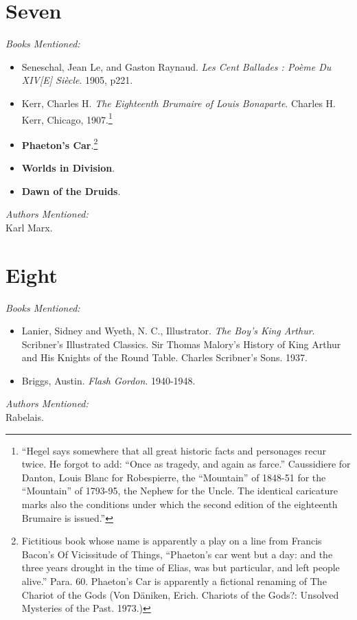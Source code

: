 \documentclass[twoside,10pt]{report}
\begin{document}
\section{Seven}
\textit{Books Mentioned:}
\begin{itemize}
\item Seneschal, Jean Le, and Gaston Raynaud. \textit{Les Cent Ballades : Poème Du XIV[E] Siècle}. 1905, p221.\cite{Seneschal1905}
\item Kerr, Charles H. \textit{The Eighteenth Brumaire of Louis Bonaparte}. Charles H. Kerr, Chicago, 1907.\cite{Kerr1907}\footnote{“Hegel says somewhere that all great historic facts and personages recur twice. He forgot to add: “Once as tragedy, and again as farce.” Caussidiere for Danton, Louis Blanc for Robespierre, the “Mountain” of 1848-51 for the “Mountain” of 1793-95, the Nephew for the Uncle. The identical caricature marks also the conditions under which the second edition of the eighteenth Brumaire is issued.”}
\item \textbf{Phaeton’s Car}.\footnote{Fictitious book whose name is apparently a play on a line from Francis Bacon’s Of Vicissitude of Things, “Phaeton’s car went but a day: and the three years drought in the time of Elias, was but particular, and left people alive.” Para. 60. Phaeton’s Car is apparently a fictional renaming of The Chariot of the Gods (Von Däniken, Erich. Chariots of the Gods?: Unsolved Mysteries of the Past. 1973.)}
\item \textbf{Worlds in Division}.
\item \textbf{Dawn of the Druids}.
\end{itemize}
\textit{Authors Mentioned:}\\
Karl Marx.

\section{Eight}
\textit{Books Mentioned:}
\begin{itemize}
\item Lanier, Sidney and Wyeth, N. C., Illustrator. \textit{The Boy’s King Arthur}. Scribner’s Illustrated Classics. Sir Thomas Malory’s History of King Arthur and His Knights of the Round Table. Charles Scribner’s Sons. 1937.\cite{Lanier1937}
\item Briggs, Austin. \textit{Flash Gordon}. 1940-1948.\cite{Briggs1940}
\end{itemize}
\textit{Authors Mentioned:}\\
Rabelais.
\end{document}
